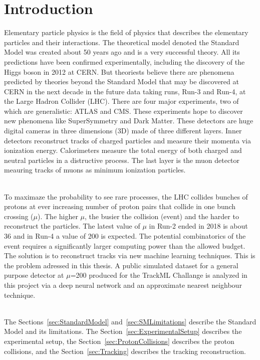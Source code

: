 \chapter{Introduction}
\label{chapter:Introduction}

Elementary particle physics is the field of physics that describes the elementary particles and their interactions. The theoretical model denoted the Standard Model was created about 50 years ago and is a very successful theory. All its predictions have been confirmed experimentally, including the discovery of the Higgs boson in 2012 at CERN.  But theoriests believe there are phenomena predicted by theories beyond the Standard Model that may be discovered at CERN in the next decade in the future data taking runs, Run-3 and Run-4, at the Large Hadron Collider (LHC). There are four major experiments, two of which are generalistic: ATLAS and CMS. These experiments hope to discover new phenomena like SuperSymmetry and Dark Matter. These detectors are huge digital cameras in three dimensions (3D) made of three different layers. Inner detectors reconstruct tracks of charged particles and measure their momenta via ionization energy. Calorimeters measure the total energy of both charged and neutral particles in a distructive process. The last layer is the muon detector meauring tracks of muons as minimum ionization particles.

\ \\To maximaze the probability to see rare processes, the LHC collides bunches of protons at ever increasing number of proton pairs that collide in one bunch crossing ($\mu$). The higher $\mu$, the busier the collision (event) and the harder to reconstruct the particles. The latest value of $\mu$ in Run-2 ended in 2018 is about 36 and in Run-4 a value of 200 is expected. The potential combinatorics of the event requires a significantly larger computing power than the allowed budget. The solution is to reconstruct tracks via new machine learning techniques. This is the problem adressed in this thesis. A public simulated dataset for a general purpose detector at $\mu$=200 produced for the TrackML Challange is analyzed in this project via a deep neural network and an approximate nearest neighbour technique.

\ \\The Sections~\ref{sec:StandardModel} and~\ref{sec:SMLimitations} describe the Standard Model and its limitations. The Section~\ref{sec:ExperimentalSetup} describes the experimental setup, the Section~\ref{sec:ProtonCollisions} describes the proton collisions, and the Section~\ref{sec:Tracking} describes the tracking reconstruction.


